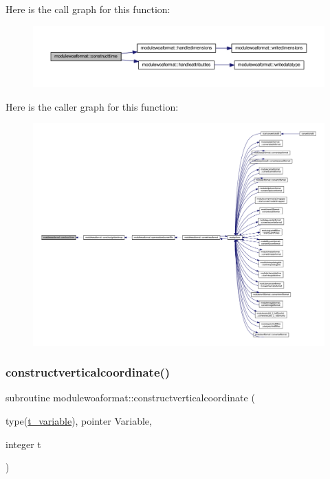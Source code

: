 Here is the call graph for this function\+:\nopagebreak
\begin{figure}[H]
\begin{center}
\leavevmode
\includegraphics[width=350pt]{namespacemodulewoaformat_a99ab25469c7485e8abd999389b55602e_cgraph}
\end{center}
\end{figure}
Here is the caller graph for this function\+:\nopagebreak
\begin{figure}[H]
\begin{center}
\leavevmode
\includegraphics[width=350pt]{namespacemodulewoaformat_a99ab25469c7485e8abd999389b55602e_icgraph}
\end{center}
\end{figure}
\mbox{\label{namespacemodulewoaformat_a67b34e0648f36008251527dc7f49084b}} 
\subsubsection{\texorpdfstring{constructverticalcoordinate()}{constructverticalcoordinate()}}
{\footnotesize\ttfamily subroutine modulewoaformat\+::constructverticalcoordinate (\begin{DoxyParamCaption}\item[{type(\mbox{\hyperlink{structmodulewoaformat_1_1t__variable}{t\+\_\+variable}}), pointer}]{Variable,  }\item[{integer}]{t }\end{DoxyParamCaption})\hspace{0.3cm}{\ttfamily [private]}}

